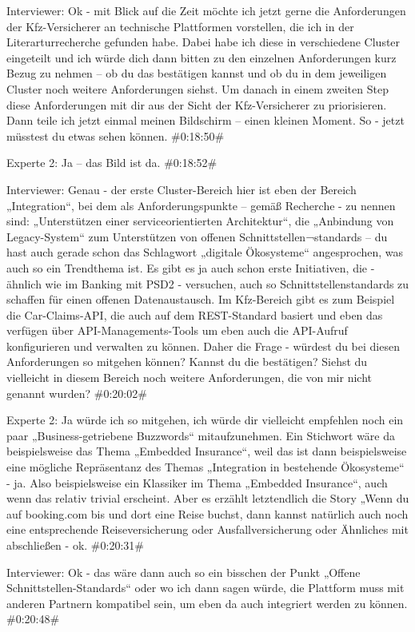 Interviewer:
Ok - mit Blick auf die Zeit möchte ich jetzt gerne die Anforderungen der Kfz-Versicherer an technische Plattformen vorstellen, die ich in der Literarturrecherche gefunden habe. Dabei habe ich diese in verschiedene Cluster eingeteilt und ich würde dich dann bitten zu den einzelnen Anforderungen kurz Bezug zu nehmen – ob du das bestätigen kannst und ob du in dem jeweiligen Cluster noch weitere Anforderungen siehst. Um danach in einem zweiten Step diese Anforderungen mit dir aus der Sicht der Kfz-Versicherer zu priorisieren. Dann teile ich jetzt einmal meinen Bildschirm – einen kleinen Moment. So - jetzt müsstest du etwas sehen können.
\#0:18:50\#

Experte 2:
Ja – das Bild ist da.
\#0:18:52\#

Interviewer:
Genau - der erste Cluster-Bereich hier ist eben der Bereich „Integration“, bei dem als Anforderungspunkte – gemäß Recherche - zu nennen sind: „Unterstützen einer serviceorientierten Architektur“, die „Anbindung von Legacy-System“ zum Unterstützen von offenen Schnittstellen¬standards – du hast auch gerade schon das Schlagwort „digitale Ökosysteme“ angesprochen, was auch so ein Trendthema ist. Es gibt es ja auch schon erste Initiativen, die - ähnlich wie im Banking mit PSD2 - versuchen, auch so Schnittstellenstandards zu schaffen für einen offenen Datenaustausch. Im Kfz-Bereich gibt es zum Beispiel die Car-Claims-API, die auch auf dem REST-Standard basiert und eben das verfügen über API-Managements-Tools um eben auch die API-Aufruf konfigurieren und verwalten zu können. Daher die Frage - würdest du bei diesen Anforderungen so mitgehen können? Kannst du die bestätigen? Siehst du vielleicht in diesem Bereich noch weitere Anforderungen, die von mir nicht genannt wurden?
\#0:20:02\#

Experte 2:
Ja würde ich so mitgehen, ich würde dir vielleicht empfehlen noch ein paar „Business-getriebene Buzzwords“ mitaufzunehmen. Ein Stichwort wäre da beispielsweise das Thema „Embedded Insurance“, weil das ist dann beispielsweise eine mögliche Repräsentanz des Themas „Integration in bestehende Ökosysteme“ - ja. Also beispielsweise ein Klassiker im Thema „Embedded Insurance“, auch wenn das relativ trivial erscheint. Aber es erzählt letztendlich die Story „Wenn du auf booking.com bis und dort eine Reise buchst, dann kannst natürlich auch noch eine entsprechende Reiseversicherung oder Ausfallversicherung oder Ähnliches mit abschließen - ok.
\#0:20:31\#

Interviewer:
Ok - das wäre dann auch so ein bisschen der Punkt „Offene Schnittstellen-Standards“ oder wo ich dann sagen würde, die Plattform muss mit anderen Partnern kompatibel sein, um eben da auch integriert werden zu können.
\#0:20:48\#

